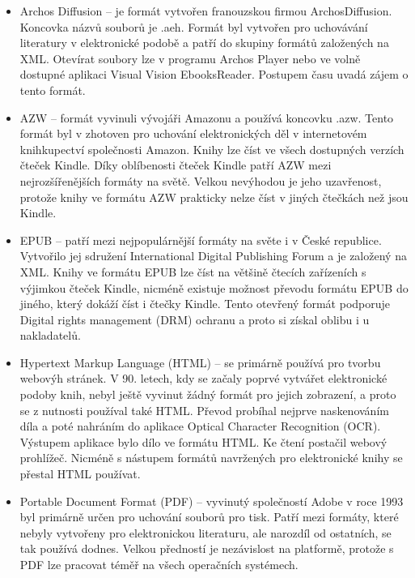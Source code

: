             \begin{itemize}
                \item Archos Diffusion – je formát vytvořen franouzskou firmou  ArchosDiffusion. Koncovka názvů souborů je .aeh. Formát byl vytvořen pro uchovávání literatury v elektronické podobě a patří do skupiny formátů založených na XML. Otevírat soubory lze v programu Archos Player nebo ve volně dostupné aplikaci Visual Vision EbooksReader. Postupem času uvadá zájem o tento formát.
                
                \item AZW – formát vyvinuli vývojáři Amazonu a používá koncovku .azw. Tento formát byl v zhotoven pro uchování elektronických děl v internetovém knihkupectví společnosti Amazon. Knihy lze číst ve všech dostupných verzích čteček Kindle. Díky oblíbenosti čteček Kindle patří AZW mezi nejrozšířenějších formáty na světě. Velkou nevýhodou je jeho uzavřenost, protože knihy ve formátu AZW prakticky nelze číst v jiných čtečkách než jsou Kindle.
                
                \item EPUB – patří mezi nejpopulárnější formáty na světe i v České republice. Vytvořilo jej sdružení International Digital Publishing Forum a je založený na XML. Knihy ve formátu EPUB lze číst na většině čtecích zařízeních s výjimkou čteček Kindle, nicméně existuje možnost převodu formátu EPUB do jiného, který dokáží číst i čtečky Kindle. Tento otevřený formát podporuje Digital rights management (DRM) ochranu a proto si získal oblibu i u nakladatelů.
                
                \item Hypertext Markup Language (HTML) – se primárně používá pro tvorbu webovýh stránek. V 90. letech, kdy se začaly poprvé vytvářet elektronické podoby knih, nebyl ještě vyvinut žádný formát pro jejich zobrazení, a proto se z nutnosti používal také HTML. Převod probíhal nejprve naskenováním díla a poté nahráním do aplikace Optical Character Recognition (OCR). Výstupem aplikace bylo dílo ve formátu HTML. Ke čtení postačil webový prohlížeč. Nicméně s nástupem formátů navržených pro elektronické knihy se přestal HTML používat.
                
                \item Portable Document Format (PDF) – vyvinutý společností Adobe v roce 1993 byl primárně určen pro uchování souborů pro tisk. Patří mezi formáty, které nebyly vytvořeny pro elektronickou literaturu, ale narozdíl od ostatních, se tak používá dodnes. Velkou předností je nezávislost na platformě, protože s PDF lze pracovat téměř na všech operačních systémech. 
                

\end{itemize}
